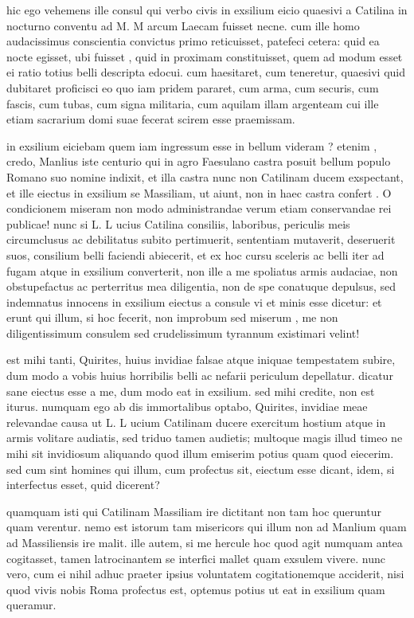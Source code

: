  hic ego vehemens ille consul qui verbo civis in exsilium eicio quaesivi a Catilina in nocturno conventu ad M. M arcum Laecam fuisset necne. cum ille homo audacissimus conscientia convictus primo reticuisset, patefeci cetera: quid ea nocte egisset, ubi fuisset , quid in proximam constituisset, quem ad modum esset ei ratio totius belli descripta edocui. cum haesitaret, cum teneretur, quaesivi quid dubitaret proficisci eo quo iam pridem pararet, cum arma, cum securis, cum fascis, cum tubas, cum signa militaria, cum aquilam illam argenteam cui ille etiam sacrarium domi suae fecerat scirem esse praemissam.

 in exsilium eiciebam quem iam ingressum esse in bellum videram ? etenim , credo, Manlius iste centurio qui in agro Faesulano castra posuit bellum populo Romano suo nomine indixit, et illa castra nunc non Catilinam ducem exspectant, et ille eiectus in exsilium se Massiliam, ut aiunt, non in haec castra confert . O condicionem miseram non modo administrandae verum etiam conservandae rei publicae! nunc si L. L ucius Catilina consiliis, laboribus, periculis meis circumclusus ac debilitatus subito pertimuerit, sententiam mutaverit, deseruerit suos, consilium belli faciendi abiecerit, et ex hoc cursu sceleris ac belli iter ad fugam atque in exsilium converterit, non ille a me spoliatus armis audaciae, non obstupefactus ac perterritus mea diligentia, non de spe conatuque depulsus, sed indemnatus innocens in exsilium eiectus a consule vi et minis esse dicetur: et erunt qui illum, si hoc fecerit, non improbum sed miserum , me non diligentissimum consulem sed crudelissimum tyrannum existimari velint!

 est mihi tanti, Quirites, huius invidiae falsae atque iniquae tempestatem subire, dum modo a vobis huius horribilis belli ac nefarii periculum depellatur. dicatur sane eiectus esse a me, dum modo eat in exsilium. sed mihi credite, non est iturus. numquam ego ab dis immortalibus optabo, Quirites, invidiae meae relevandae causa ut L. L ucium Catilinam ducere exercitum hostium atque in armis volitare audiatis, sed triduo tamen audietis; multoque magis illud timeo ne mihi sit invidiosum aliquando quod illum emiserim potius quam quod eiecerim. sed cum sint homines qui illum, cum profectus sit, eiectum esse dicant, idem, si interfectus esset, quid dicerent?

 quamquam isti qui Catilinam Massiliam ire dictitant non tam hoc queruntur quam verentur. nemo est istorum tam misericors qui illum non ad Manlium quam ad Massiliensis ire malit. ille autem, si me hercule hoc quod agit numquam antea cogitasset, tamen latrocinantem se interfici mallet quam exsulem vivere. nunc vero, cum ei nihil adhuc praeter ipsius voluntatem cogitationemque acciderit, nisi quod vivis nobis Roma profectus est, optemus potius ut eat in exsilium quam queramur.

